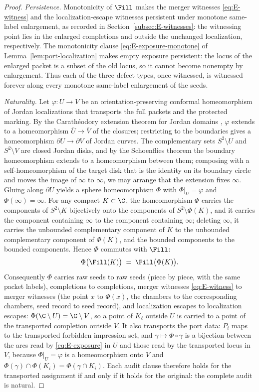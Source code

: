 \begin{proof}
\emph{Persistence.}
Monotonicity of $\Fill$ makes the merger witnesses \eqref{eq:E-witness} and the
localization-escape witnesses persistent under monotone same-label enlargement, as
recorded in Section~\ref{subsec:E-witnesses}: the witnessing point lies in the
enlarged completions and outside the unchanged localization, respectively. The
monotonicity clause \eqref{eq:E-exposure-monotone} of
Lemma~\ref{lem:port-localization} makes empty exposure persistent: the locus of the
enlarged packet is a subset of the old locus, so it cannot become nonempty by
enlargement. Thus each of the three defect types, once witnessed, is witnessed
forever along every monotone same-label enlargement of the seeds.

\emph{Naturality.}
Let $\varphi\colon U\to V$ be an orientation-preserving conformal homeomorphism of
Jordan localizations that transports the full packets and the protected marking. By
the Carath\'eodory extension theorem for Jordan domains \cite{Pom92}, $\varphi$
extends to a homeomorphism $\overline U\to\overline V$ of the closures; restricting
to the boundaries gives a homeomorphism $\partial U\to\partial V$ of Jordan curves.
The complementary sets $S^2\setminus U$ and $S^2\setminus V$ are closed Jordan disks,
and by the Schoenflies theorem \cite{New51} the boundary homeomorphism extends to a
homeomorphism between them; composing with a self-homeomorphism of the target disk
that is the identity on its boundary circle and moves the image of $\infty$ to
$\infty$, we may arrange that the extension fixes $\infty$. Gluing along
$\partial U$ yields a sphere homeomorphism $\Phi$ with $\Phi|_U=\varphi$ and
$\Phi(\infty)=\infty$. For any compact $K\subset\C$, the homeomorphism $\Phi$ carries
the components of $S^2\setminus K$ bijectively onto the components of
$S^2\setminus\Phi(K)$, and it carries the component containing $\infty$ to the
component containing $\infty$; deleting $\infty$, it carries the unbounded
complementary component of $K$ to the unbounded complementary component of
$\Phi(K)$, and the bounded components to the bounded components. Hence $\Phi$
commutes with $\Fill$:
\[
\Phi\bigl(\Fill(K)\bigr)\;=\;\Fill\bigl(\Phi(K)\bigr).
\]
Consequently $\Phi$ carries raw seeds to raw seeds (piece by piece, with the same
packet labels), completions to completions, merger witnesses
\eqref{eq:E-witness} to merger witnesses (the point $x$ to $\Phi(x)$, the chambers to
the corresponding chambers, seed record to seed record), and localization escapes to
localization escapes: $\Phi(\C\setminus U)=\C\setminus V$, so a point of $K_\ell$
outside $U$ is carried to a point of the transported completion outside $V$. It also transports the port data: $P_i$ maps to
the transported forbidden impression set, and $\gamma\mapsto\Phi\circ\gamma$ is a
bijection between the arcs read by \eqref{eq:E-exposure} in $U$ and those read by the
transported locus in $V$, because $\Phi|_U=\varphi$ is a homeomorphism onto $V$ and
$\Phi(\gamma)\cap\Phi(K_i)=\Phi(\gamma\cap K_i)$. Each audit clause therefore holds
for the transported assignment if and only if it holds for the original: the
complete audit is natural.
\end{proof}

